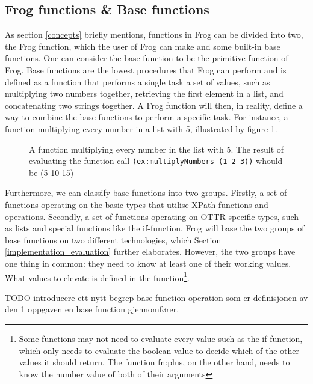 \subsection{Frog functions \& Base functions}
As section \ref{concepts} briefly mentions, functions in Frog can be divided into two, the Frog function, which the user of Frog can make and some built-in base functions. One can consider the base function to be the primitive function of Frog. Base functions are the lowest procedures that Frog can perform and is defined as a function that performs a single task a set of values, such as multiplying two numbers together, retrieving the first element in a list, and concatenating two strings together. A Frog function will then, in reality, define a way to combine the base functions to perform a specific task. For instance, a function multiplying every number in a list with 5, illustrated by figure \ref{fig:list_multiplication}. 

\begin{figure}
    
    \caption{A function multiplying every number in the list with 5. The result of evaluating the function call \lstinline{(ex:multiplyNumbers (1 2 3))} whould be (5 10 15)}
    \label{fig:list_multiplication}
\end{figure}


\para
Furthermore, we can classify base functions into two groups. Firstly, a set of functions operating on the basic types that utilise XPath functions and operations. Secondly, a set of functions operating on OTTR specific types, such as lists and special functions like the if-function. Frog will base the two groups of base functions on two different technologies, which Section \ref{implementation_evaluation} further elaborates. However, the two groups have one thing in common: they need to know at least one of their working values. What values to elevate is defined in the function\footnote{Some functions may not need to evaluate every value such as the if function, which only needs to evaluate the boolean value to decide which of the other values it should return. The function fn:plus, on the other hand, needs to know the number value of both of their arguments}. 

\para 
TODO introducere ett nytt begrep base function operation som er definisjonen av den 1 oppgaven en base function gjennomfører. 

